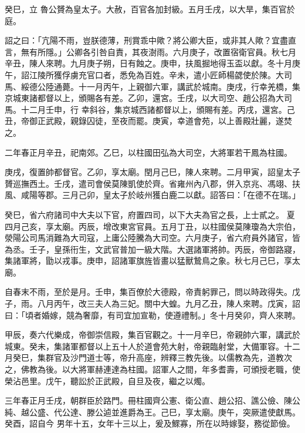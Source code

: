 \begin{pinyinscope}
 癸巳，立
 魯公贇為皇太子。大赦，百官各加封級。五月壬戌，以大旱，集百官於庭。



 詔之曰：「亢陽不雨，豈朕德薄，刑賞乖中歟？將公卿大臣，或非其人歟？宜盡直言，無有所隱。」公卿各引咎自責，其夜澍雨。六月庚子，改置宿衛官員。秋七月辛丑，陳人來聘。九月庚子朔，日有蝕之。庚申，扶風掘地得玉盃以獻。冬十月庚午，詔江陵所獲俘虜充官口者，悉免為百姓。辛未，遣小匠師楊勰使於陳。大司馬、綏德公陸通薨。十一月丙午，上親御六軍，講武於城南。庚戌，行幸羌橋，集京城東諸都督以上，頒賜各有差。乙卯，還宮。壬戌，以大司空、趙公招為大司馬。十二月壬申，行
 幸斜谷，集京城西諸都督以上，頒賜有差。丙戌，還宮。己丑，帝御正武殿，親錄囚徒，至夜而罷。庚寅，幸道會苑，以上善殿壯麗，遂焚之。



 二年春正月辛丑，祀南郊。乙巳，以柱國田弘為大司空，大將軍若干鳳為柱國。



 庚戌，復置帥都督官。乙卯，享太廟。閏月己巳，陳人來聘。二月甲寅，詔皇太子贇巡撫西土。壬戌，遣司會侯莫陳凱使於齊。省雍州內八郡，併入京兆、馮翊、扶風、咸陽等郡。三月己卯，皇太子於岐州獲白鹿二以獻。詔答曰：「在德不在瑞。」



 癸巳，省六府諸司中大夫以下官，府置四司，以下大夫為官之長，上士貳之。
 夏四月己亥，享太廟。丙辰，增改東宮官員。五月丁丑，以柱國侯莫陳瓊為大宗伯，滎陽公司馬消難為大司寇，上庸公陸騰為大司空。六月庚子，省六府員外諸官，皆為丞。壬子，皇孫衎生，文武官普加一級大階。大選諸軍將帥。丙辰，帝御路寢，集諸軍將，勖以戎事。庚申，詔諸軍旗旌皆畫以猛獸鷙鳥之象。秋七月己巳，享太廟。



 自春末不雨，至於是月。壬申，集百僚於大德殿，帝責躬罪己，問以時政得失。戊子，雨。八月丙午，改三夫人為三妃。關中大蝗。九月乙丑，陳人來聘。戊寅，詔曰：「頃者婚嫁，競為奢靡，有司宜加宣勒，使遵禮制。」冬十月癸卯，齊人來聘。



 甲辰，奏六代樂成，帝御崇信殿，集百官觀之。十一月辛巳，帝親帥六軍，講武於城東。癸未，集諸軍都督以上五十人於道會苑大射，帝親臨射堂，大備軍容。十二月癸巳，集群官及沙門道士等，帝升高座，辨釋三教先後。以儒教為先，道教次之，佛教為後。以大將軍赫連達為柱國。詔軍人之間，年多耆壽，可頒授老職，使榮沾邑里。戊午，聽訟於正武殿，自旦及夜，繼之以燭。



 三年春正月壬戌，朝群臣於路門。冊柱國齊公憲、衛公直、趙公招、譙公儉、陳公純、越公盛、代公達、滕公逌並進爵為王。己巳，享太廟。庚午，突厥遣使獻馬。癸酉，詔自今
 男年十五，女年十三以上，爰及鰥寡，所在以時嫁娶，務從節儉。




\end{pinyinscope}
